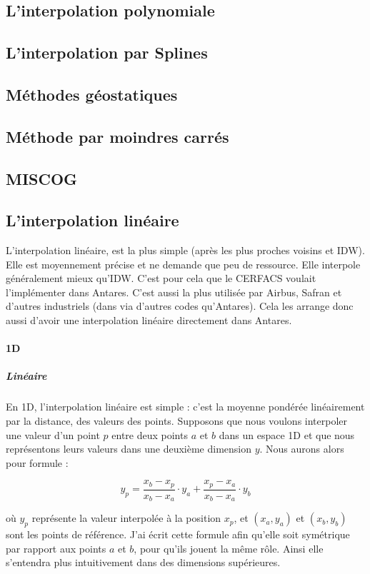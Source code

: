 \subsection{L'interpolation polynomiale}
\subsection{L'interpolation par Splines}
\subsection{Méthodes géostatiques}
\subsection{Méthode par moindres carrés}
\subsection{MISCOG}

\subsection{L'interpolation linéaire}
L'interpolation linéaire, est la plus simple (après les plus proches voisins et IDW). Elle est moyennement précise et ne demande que peu de ressource. Elle interpole généralement mieux qu'IDW. C'est pour cela que le CERFACS voulait l'implémenter dans Antares. C'est aussi la plus utilisée par Airbus, Safran et d'autres industriels (dans via d'autres codes qu'Antares). Cela les arrange donc aussi d'avoir une interpolation linéaire directement dans Antares.


\paragraph{1D}
\subparagraph{Linéaire}

En 1D, l'interpolation linéaire est simple : c'est la moyenne pondérée linéairement par la distance, des valeurs des points.
Supposons que nous voulons interpoler une valeur d'un point \( p \) entre deux points \( a \) et \( b \) dans un espace 1D
et que nous représentons leurs valeurs dans une deuxième dimension \( y \).
Nous aurons alors pour formule :

\[
y_p = \frac{x_b - x_p}{x_b - x_a} \cdot y_a + \frac{x_p - x_a}{x_b - x_a} \cdot y_b
\]

où \( y_p \) représente la valeur interpolée à la position \( x_p \), et \((x_a, y_a)\) et \((x_b, y_b)\) sont les points de référence. J'ai écrit cette formule afin qu'elle soit symétrique par rapport aux points \( a \) et \( b \), pour qu'ils jouent la même rôle. Ainsi elle s'entendra plus intuitivement dans des dimensions supérieures.
\vspace{0.5cm}


